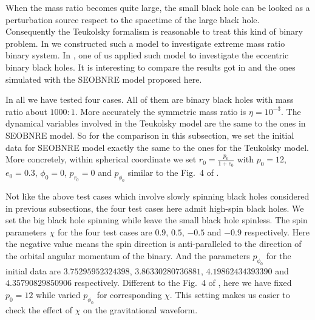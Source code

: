 \documentclass[prd,aps,a4paper,superscriptaddress,twocolumn,footinbib,showpacs]{revtex4}
\begin{document}
When the mass ratio becomes quite large, the small black hole can be looked as a perturbation source respect to the spacetime of the large black hole. Consequently the Teukolsky formalism is reasonable to treat this kind of binary problem. In \cite{han2011constructing} we constructed such a model to investigate extreme mass ratio binary system. In \cite{han2014gravitational}, one of us applied such model to investigate the eccentric binary black holes. It is interesting to compare the results got in \cite{han2014gravitational} and the ones simulated with the SEOBNRE model proposed here.

In all we have tested four cases. All of them are binary black holes with mass ratio about $1000:1$. More accurately the symmetric mass ratio is $\eta=10^{-3}$. The dynamical variables involved in the Teukolsky model \cite{han2011constructing,han2014gravitational} are the same to the ones in SEOBNRE model. So for the comparison in this subsection, we set the initial data for SEOBNRE model exactly the same to the ones for the Teukolsky model. More concretely, within spherical coordinate we set $r_0=\frac{p_0}{1+e_0}$ with $p_0=12$, $e_0=0.3$, $\phi_0=0$, $p_{r_0}=0$ and $p_{\phi_0}$ similar to the Fig.~4 of \cite{han2014gravitational}.

Not like the above test cases which involve slowly spinning black holes considered in previous subsections, the four test cases here admit high-spin black holes. We set the big black hole spinning while leave the small black hole spinless. The spin parameters $\chi$ for the four test cases are $0.9$, $0.5$, $-0.5$ and $-0.9$ respectively. Here the negative value means the spin direction is anti-paralleled to the direction of the orbital angular momentum of the binary. And the parameters $p_{\phi_0}$ for the initial data are $3.75295952324398$, $3.86330280736881$, $4.19862434393390$ and $4.35790829850906$ respectively. Different to the Fig.~4 of \cite{han2014gravitational}, here we have fixed $p_0=12$ while varied $p_{\phi_0}$ for corresponding $\chi$. This setting makes us easier to check the effect of $\chi$ on the gravitational waveform.
\end{document}

